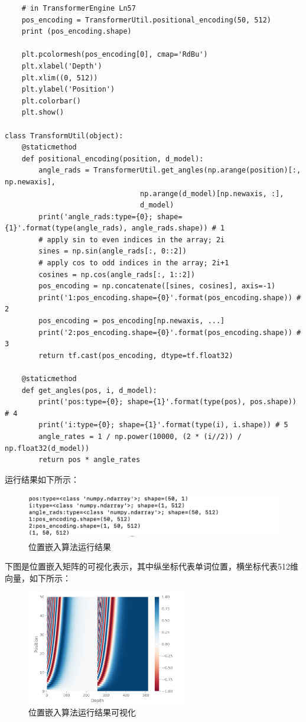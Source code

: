 \documentclass{article}
\begin{document}
\begin{lstlisting}
    # in TransformerEngine Ln57
    pos_encoding = TransformerUtil.positional_encoding(50, 512)
    print (pos_encoding.shape)

    plt.pcolormesh(pos_encoding[0], cmap='RdBu')
    plt.xlabel('Depth')
    plt.xlim((0, 512))
    plt.ylabel('Position')
    plt.colorbar()
    plt.show()

class TransformUtil(object):
    @staticmethod
    def positional_encoding(position, d_model):
        angle_rads = TransformerUtil.get_angles(np.arange(position)[:, np.newaxis],
                                np.arange(d_model)[np.newaxis, :],
                                d_model)
        print('angle_rads:type={0}; shape={1}'.format(type(angle_rads), angle_rads.shape)) # 1
        # apply sin to even indices in the array; 2i
        sines = np.sin(angle_rads[:, 0::2])
        # apply cos to odd indices in the array; 2i+1
        cosines = np.cos(angle_rads[:, 1::2])
        pos_encoding = np.concatenate([sines, cosines], axis=-1)
        print('1:pos_encoding.shape={0}'.format(pos_encoding.shape)) # 2
        pos_encoding = pos_encoding[np.newaxis, ...]
        print('2:pos_encoding.shape={0}'.format(pos_encoding.shape)) # 3
        return tf.cast(pos_encoding, dtype=tf.float32)

    @staticmethod
    def get_angles(pos, i, d_model):
        print('pos:type={0}; shape={1}'.format(type(pos), pos.shape)) # 4
        print('i:type={0}; shape={1}'.format(type(i), i.shape)) # 5
        angle_rates = 1 / np.power(10000, (2 * (i//2)) / np.float32(d_model))
        return pos * angle_rates
\end{lstlisting}
运行结果如下所示：
\begin{figure}[H]
    \caption{位置嵌入算法运行结果}
    \label{f000076}
    \centering
    \includegraphics[height=2cm]{images/f000076}
\end{figure}
下图是位置嵌入矩阵的可视化表示，其中纵坐标代表单词位置，横坐标代表512维向量，如下所示：
\begin{figure}[H]
    \caption{位置嵌入算法运行结果可视化 }
    \label{f000077}
    \centering
    \includegraphics[height=5cm]{images/f000077}
\end{figure}
\end{document}

